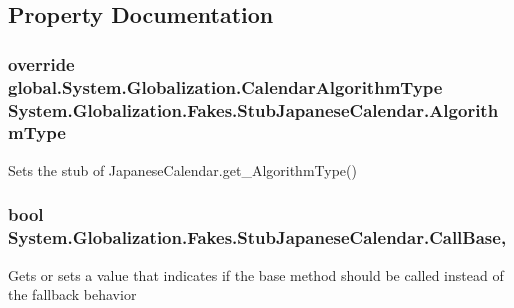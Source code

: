 \subsection{Property Documentation}
\hypertarget{class_system_1_1_globalization_1_1_fakes_1_1_stub_japanese_calendar_a14c3f2b3120918f853a21f5ebaf6a493}{
\subsubsection[{Algorithm\-Type}]{\setlength{\rightskip}{0pt plus 5cm}override global.\-System.\-Globalization.\-Calendar\-Algorithm\-Type System.\-Globalization.\-Fakes.\-Stub\-Japanese\-Calendar.\-Algorithm\-Type\hspace{0.3cm}{\ttfamily [get]}}}\label{class_system_1_1_globalization_1_1_fakes_1_1_stub_japanese_calendar_a14c3f2b3120918f853a21f5ebaf6a493}


Sets the stub of Japanese\-Calendar.\-get\-\_\-\-Algorithm\-Type()

\hypertarget{class_system_1_1_globalization_1_1_fakes_1_1_stub_japanese_calendar_a00b788914b5148788a1c3b6e7957ea55}{
\subsubsection[{Call\-Base}]{\setlength{\rightskip}{0pt plus 5cm}bool System.\-Globalization.\-Fakes.\-Stub\-Japanese\-Calendar.\-Call\-Base\hspace{0.3cm}{\ttfamily [get]}, {\ttfamily [set]}}}\label{class_system_1_1_globalization_1_1_fakes_1_1_stub_japanese_calendar_a00b788914b5148788a1c3b6e7957ea55}


Gets or sets a value that indicates if the base method should be called instead of the fallback behavior

